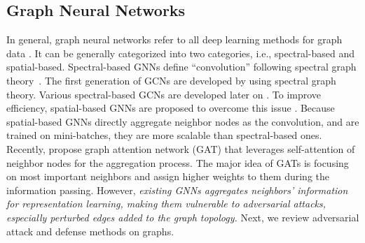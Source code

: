 \documentclass[sigconf]{acmart}
\begin{document}
\subsection{Graph Neural Networks} \label{related:gnn}
In general, graph neural networks refer to all deep learning methods for graph data \cite{wu2019comprehensive,DBLP:conf/kdd/0001WAT19,DBLP:conf/sdm/MaWAYT19,ma2019attacking,ding2019graph,ding2019deep}. It can be generally categorized into two categories, i.e., spectral-based and spatial-based. 
Spectral-based GNNs define  ``convolution'' following spectral graph theory~\cite{bruna2013spectral}. The first generation of GCNs are developed by \citeauthor{bruna2013spectral} \cite{bruna2013spectral} using spectral graph theory. Various spectral-based GCNs are developed later on \cite{defferrard2016convolutional, kipf2016semi, henaff2015deep, li2018adaptive}. 
To improve efficiency, spatial-based GNNs are  proposed to overcome this issue \cite{hamilton2017inductive,monti2017geometric,niepert2016learning,gao2018large}.
Because spatial-based GNNs directly aggregate neighbor nodes as the convolution, and are trained on mini-batches, they are more scalable than spectral-based ones.
Recently, \citeauthor{velivckovic2017graph} \cite{velivckovic2017graph} propose graph attention network (GAT) that leverages self-attention of neighbor nodes for the aggregation process. The major idea of GATs \cite{zhang2018gaan} is focusing on most important neighbors and assign higher weights to them during the information passing. 
However, \textit{existing GNNs aggregates neighbors' information for representation learning, making them vulnerable to adversarial attacks, especially perturbed edges added to the graph topology.} Next, we review adversarial attack and defense methods on graphs. 
\end{document}
